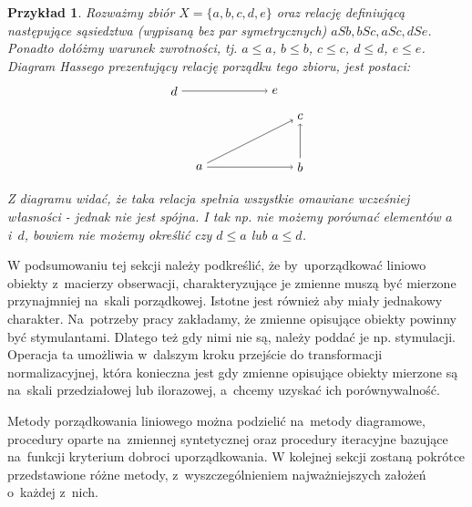 \documentclass[12pt,a4paper]{report}
\newtheorem{example}{Przykład}
\begin{document}
\begin{example}
Rozważmy zbiór $X = \{a,b,c,d,e \}$ oraz relację definiującą następujące sąsiedztwa (wypisaną bez par symetrycznych) $aSb, bSc, aSc, dSe$. Ponadto dołóżmy warunek zwrotności, tj. $a \leq a$, $b \leq b$, $c \leq c$, $d \leq d$, $e \leq e$. Diagram Hassego prezentujący relację porządku tego zbioru, jest postaci:
$$
\begin{tikzpicture}[scale=.7]
  \node (a) at (-2,0) {$a$};
  \node (b) at (2,0) {$b$};
  \node (c) at (2,2) {$c$};
 \node (e) at (1,3) {$e$};
 \node (d) at (-3,3) {$d$};
	\draw [->] (d)--(e);
	\draw [->] (a)--(b);
	\draw [->] (a)--(c);
	\draw [->] (b)--(c);
\end{tikzpicture}
$$
Z diagramu widać, że taka relacja spełnia wszystkie omawiane wcześniej własności - jednak nie jest spójna. I tak np. nie możemy porównać elementów $a$ i~$d$, bowiem nie możemy określić czy  $d \leq a$ lub $a \leq d$.
\end{example}



W podsumowaniu tej sekcji należy podkreślić, że by~uporządkować liniowo obiekty z~macierzy obserwacji, charakteryzujące je zmienne muszą być mierzone przynajmniej na~skali porządkowej. Istotne jest również aby miały jednakowy charakter. Na~potrzeby pracy zakładamy, że zmienne opisujące obiekty powinny być stymulantami. Dlatego też gdy nimi nie są, należy poddać je np. stymulacji. Operacja ta umożliwia w~dalszym kroku przejście do transformacji normalizacyjnej, która konieczna jest gdy zmienne opisujące obiekty mierzone są na~skali przedziałowej lub ilorazowej, a~chcemy uzyskać ich porównywalność.

Metody porządkowania liniowego można podzielić na~metody diagramowe, procedury oparte na~zmiennej syntetycznej oraz procedury iteracyjne bazujące na~funkcji kryterium dobroci uporządkowania. %
W kolejnej sekcji zostaną pokrótce przedstawione różne metody, z~wyszczególnieniem najważniejszych założeń o~każdej z~nich.
\end{document}
